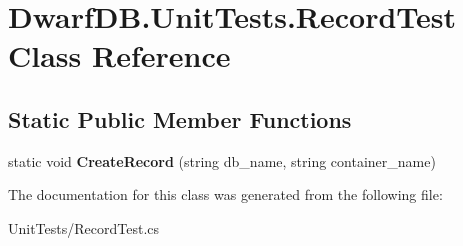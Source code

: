 \hypertarget{class_dwarf_d_b_1_1_unit_tests_1_1_record_test}{
\section{DwarfDB.UnitTests.RecordTest Class Reference}
\label{class_dwarf_d_b_1_1_unit_tests_1_1_record_test}
}
\subsection*{Static Public Member Functions}
\begin{DoxyCompactItemize}
\item 
\hypertarget{class_dwarf_d_b_1_1_unit_tests_1_1_record_test_a907b0948a207c3deb0d62b1df26bf1f6}{
static void {\bfseries CreateRecord} (string db\_\-name, string container\_\-name)}
\label{class_dwarf_d_b_1_1_unit_tests_1_1_record_test_a907b0948a207c3deb0d62b1df26bf1f6}

\end{DoxyCompactItemize}


The documentation for this class was generated from the following file:\begin{DoxyCompactItemize}
\item 
UnitTests/RecordTest.cs\end{DoxyCompactItemize}
